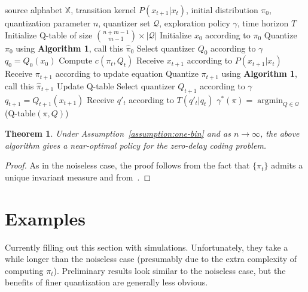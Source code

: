 \documentclass[conference]{IEEEtran}
\newtheorem{theorem}{Theorem}[section]
\DeclareMathOperator*{\argmin}{argmin}
\begin{document}
\begin{algorithmic}[1]
    \REQUIRE source alphabet \(\mathbb{X}\), transition kernel \(P(x_{t+1} | x_t)\), initial distribution \(\pi_0\), quantization parameter \(n\), quantizer set \(\mathcal{Q}\), exploration policy \(\gamma\), time horizon \(T\)
    \STATE Initialize Q-table of size \( {{n+m-1} \choose {m-1}} \times |\mathcal{Q}| \)
    \STATE Initialize \( x_0 \) according to \( \pi_0 \)
    \STATE Quantize \( \pi_0 \) using \textbf{Algorithm 1}, call this \( \hat{\pi}_0 \)
    \STATE Select quantizer \( Q_0 \) according to \( \gamma \)
    \STATE \( q_0 = Q_0(x_0) \)
    \STATE Compute \(c(\pi_t, Q_t)\) 
    \STATE Receive \( x_{t+1} \) according to \( P(x_{t+1} | x_t) \)
    \STATE Receive \( \pi_{t+1} \) according to update equation 
    \STATE Quantize \( \pi_{t+1} \) using \textbf{Algorithm 1}, call this \( \hat{\pi}_{t+1} \)
    \STATE Update Q-table
    \STATE Select quantizer \( Q_{t+1} \) according to \( \gamma \)
    \STATE \( q_{t+1} = Q_{t+1}(x_{t+1}) \)
    \STATE Receive \(q'_t\) according to \(T(q'_t | q_t)\)
    \ENDFOR
    \RETURN \(\gamma^*(\pi) = \argmin_{Q \in \mathcal{Q}}\)(Q-table\((\pi,Q)\))
\end{algorithmic}

\begin{theorem}
    Under Assumption~\ref{assumption:one-bin} and as \(n \to \infty\), the above algorithm gives a near-optimal policy for the zero-delay coding problem.
\end{theorem}
\begin{proof}
    As in the noiseless case, the proof follows from the fact that \( \{\pi_t\} \) admits a unique invariant measure and from~\cite[Theorem 3.2]{Kara}.
\end{proof}

\section{Examples}
Currently filling out this section with simulations. Unfortunately, they take a while longer than the noiseless case (presumably due to the extra complexity of computing \(\pi_t\)). Preliminary results look similar to the noiseless case, but the benefits of finer quantization are generally less obvious.

\printbibliography
\end{document}
